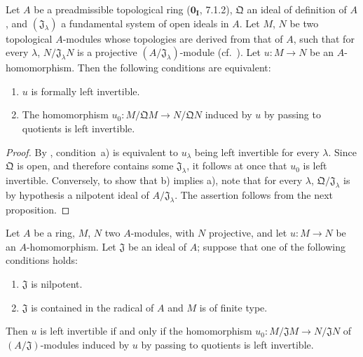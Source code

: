 \begin{proposition}[19.1.9]
\label{0.19.1.9}
Let $A$ be a preadmissible topological ring ($\mathbf{0_I}$, 7.1.2), $\mathfrak Q$ an ideal of definition of $A$, and $(\mathfrak J_\lambda)$ a fundamental system of open ideals in $A$.
Let $M$, $N$ be two topological $A$-modules whose topologies are derived from that of $A$, such that for every $\lambda$, $N/\mathfrak J_\lambda N$ is a projective $(A/\mathfrak J_\lambda)$-module (cf.~).
Let $u:M\to N$ be an $A$-homomorphism.
Then the following conditions are equivalent:
\begin{enumerate}
  \item[a)] $u$ is formally left invertible.


  \item[b)] The homomorphism $u_0:M/\mathfrak QM\to N/\mathfrak QN$ induced by $u$ by passing to quotients is left invertible.
\end{enumerate}
\end{proposition}

\begin{proof}
By , condition~a) is equivalent to $u_\lambda$ being left invertible for every $\lambda$.
Since $\mathfrak Q$ is open, and therefore contains some $\mathfrak J_\lambda$, it follows at once that $u_0$ is left invertible.
Conversely, to show that b) implies a), note that for every $\lambda$, $\mathfrak Q/\mathfrak J_\lambda$ is by hypothesis a nilpotent ideal of $A/\mathfrak J_\lambda$.
The assertion follows from the next proposition.
\end{proof}

\begin{proposition}[19.1.10]
\label{0.19.1.10}
Let $A$ be a ring, $M$, $N$ two $A$-modules, with $N$ projective, and let $u:M\to N$ be an $A$-homomorphism.
Let $\mathfrak J$ be an ideal of $A$;
suppose that one of the following conditions holds:
\begin{enumerate}
  \item[(i)] $\mathfrak J$ is nilpotent.
  \item[(ii)] $\mathfrak J$ is contained in the radical of $A$ and $M$ is of finite type.
\end{enumerate}
Then $u$ is left invertible if and only if the homomorphism
$u_0:M/\mathfrak JM\to N/\mathfrak JN$ of $(A/\mathfrak J)$-modules induced by $u$ by passing to quotients is left invertible.
\end{proposition}

